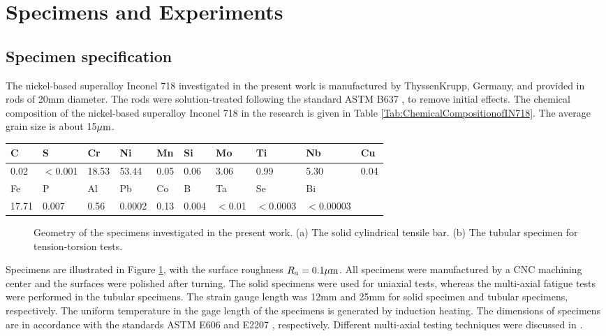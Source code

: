 \documentclass[preprint,5p,twocolumn,11pt,sort&compress]{elsarticle}
\begin{document}
\section{Specimens and Experiments}

\subsection{Specimen specification}
\noindent The nickel-based superalloy Inconel 718 investigated in the present work is manufactured by ThyssenKrupp, Germany, and provided in rods of 20mm diameter. The rods were solution-treated following the standard ASTM B637 \cite{ASTMB637}, to remove initial effects.
The chemical composition of the nickel-based superalloy Inconel 718 in the research is given in Table \ref{Tab:ChemicalCompositionofIN718}. The average grain size is about 15$\rm{\mu m}$.

\begin{table*}[htbp]
  \centering
  \caption{Chemical composition of the investigated material Inconel 718 (wt. \%).}
    \begin{tabular}{llllllllll}
    \hline
    C     & S     & Cr    & Ni    & Mn    & Si    & Mo    & Ti    & Nb    & Cu \\
    \hline
    0.02  & $<$0.001 & 18.53 & 53.44 & 0.05  & 0.06  & 3.06  & 0.99  & 5.30  & 0.04 \\
    \hline
    Fe    & P     & Al    & Pb    & Co    & B     & Ta    & Se    & Bi    &  \\
    \hline
    17.71 & 0.007 & 0.56  & 0.0002 & 0.13  & 0.004 & $<$0.01 & $<$0.0003 & $<$0.00003 &  \\
    \hline
    \end{tabular}%
  \label{Tab:ChemicalCompositionofIN718}%
\end{table*}%


\begin{figure}[!htp]
\caption{Geometry of the specimens investigated in the present work. (a) The solid cylindrical tensile bar. (b) The tubular specimen for tension-torsion tests.}
\label{Fig:Specimen}
\end{figure}


Specimens are illustrated in Figure \ref{Fig:Specimen}, with the surface roughness  $R_a=0.1\rm{\mu m}$. All specimens were manufactured by a CNC machining center and the surfaces were polished after turning. The solid specimens were used for uniaxial tests, whereas the multi-axial fatigue tests were performed in the tubular specimens. The strain gauge length was 12mm and 25mm for solid specimen and tubular specimens, respectively. The uniform temperature in the gage length of the specimens is generated by induction heating. The dimensions of specimens are in accordance with the standards ASTM E606 \cite{astm1998standard} and E2207 \cite{standard2007e2207}, respectively. Different multi-axial testing techniques were discussed in \cite{socie2000multiaxial}.
\end{document}
